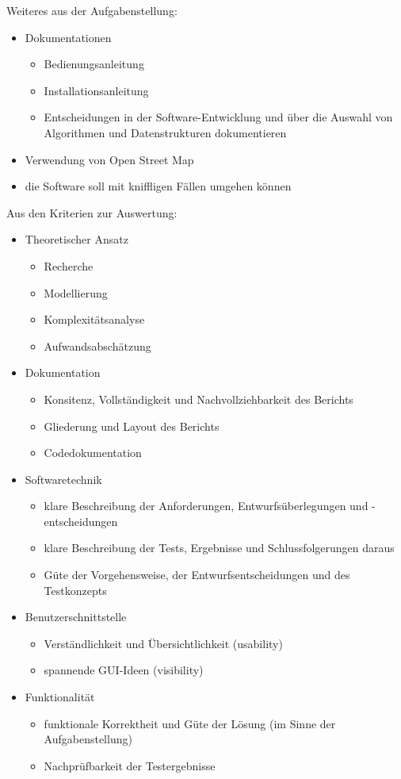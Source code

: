 Weiteres aus der Aufgabenstellung:
\begin{itemize}
 \item Dokumentationen
 \begin{itemize}
 \item Bedienungsanleitung
 \item Installationsanleitung
 \item Entscheidungen in der Software-Entwicklung und über die Auswahl von Algorithmen und Datenstrukturen dokumentieren
 \end{itemize}
 \item Verwendung von Open Street Map
 \item die Software soll mit kniffligen Fällen umgehen können
\end{itemize}
Aus den Kriterien zur Auswertung:
\begin{itemize}
 \item Theoretischer Ansatz
 \begin{itemize}
 \item Recherche
 \item Modellierung
 \item Komplexitätsanalyse
 \item Aufwandsabschätzung
 \end{itemize}
 \item Dokumentation
 \begin{itemize}
 \item Konsitenz, Vollständigkeit und Nachvollziehbarkeit des Berichts
 \item Gliederung und Layout des Berichts
 \item Codedokumentation
 \end{itemize}
 \item Softwaretechnik
 \begin{itemize}
 \item klare Beschreibung der Anforderungen, Entwurfsüberlegungen und -entscheidungen
 \item klare Beschreibung der Tests, Ergebnisse und Schlussfolgerungen daraus
 \item Güte der Vorgehensweise, der Entwurfsentscheidungen und des Testkonzepts
 \end{itemize}
 \item Benutzerschnittstelle
 \begin{itemize}
 \item Verständlichkeit und Übersichtlichkeit (usability)
 \item spannende GUI-Ideen (visibility)
 \end{itemize}
 \item Funktionalität
 \begin{itemize}
 \item funktionale Korrektheit und Güte der Lösung (im Sinne der Aufgabenstellung)
 \item Nachprüfbarkeit der Testergebnisse
 \end{itemize}
\end{itemize}



